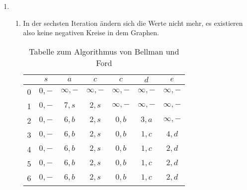 \documentclass[a4paper]{scrartcl}
\begin{document}
\begin{enumerate}[label=\bfseries\arabic*.]
    \item
        \begin{enumerate}
            \item
                In der sechsten Iteration ändern sich die Werte nicht mehr,
                es existieren also keine negativen Kreise in dem Graphen.
                \begin{table}[h]
                    \centering
                    \begin{tabular}{r|c|c|c|c|c|c|}
                          & $s$ & $a$ & $c$ & $c$ & $d$ & $e$ \\ \hline
                        0 & $0,-$ & $\infty,-$ & $\infty,-$ & $\infty,-$ & $\infty,-$ & $\infty,-$ \\
                        1 & $0,-$ & $7,s$ & $2,s$ & $\infty,-$ & $\infty,-$ & $\infty,-$ \\
                        2 & $0,-$ & $6,b$ & $2,s$ & $0,b$ & $3,a$ & $\infty,-$ \\
                        3 & $0,-$ & $6,b$ & $2,s$ & $0,b$ & $1,c$ & $4,d$ \\
                        4 & $0,-$ & $6,b$ & $2,s$ & $0,b$ & $1,c$ & $2,d$ \\
                        5 & $0,-$ & $6,b$ & $2,s$ & $0,b$ & $1,c$ & $2,d$ \\
                        6 & $0,-$ & $6,b$ & $2,s$ & $0,b$ & $1,c$ & $2,d$ \\
                    \end{tabular}
                    \caption{Tabelle zum Algorithmus von Bellman und Ford}
                    \label{tab:bf1}
                \end{table}


\end{enumerate}
\end{enumerate}
\end{document}
